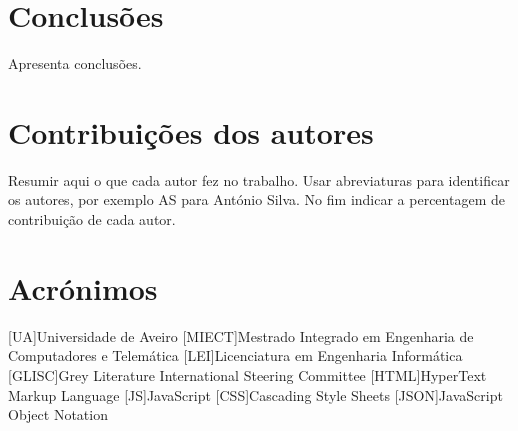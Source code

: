 \documentclass{report}
\begin{document}
\chapter{Conclusões}
\label{chap.conclusao}
Apresenta conclusões.

\chapter*{Contribuições dos autores}
Resumir aqui o que cada autor fez no trabalho.
Usar abreviaturas para identificar os autores,
por exemplo AS para António Silva.
No fim indicar a percentagem de contribuição de cada autor.

\chapter*{Acrónimos}
\begin{acronym}
[UA]{Universidade de Aveiro}
[MIECT]{Mestrado Integrado em Engenharia de Computadores e Telemática}
[LEI]{Licenciatura em Engenharia Informática}
[GLISC]{Grey Literature International Steering Committee}
[HTML]{HyperText Markup Language}
[JS]{JavaScript}
[CSS]{Cascading Style Sheets}
[JSON]{JavaScript Object Notation}
\end{acronym}


\printbibliography
\end{document}

